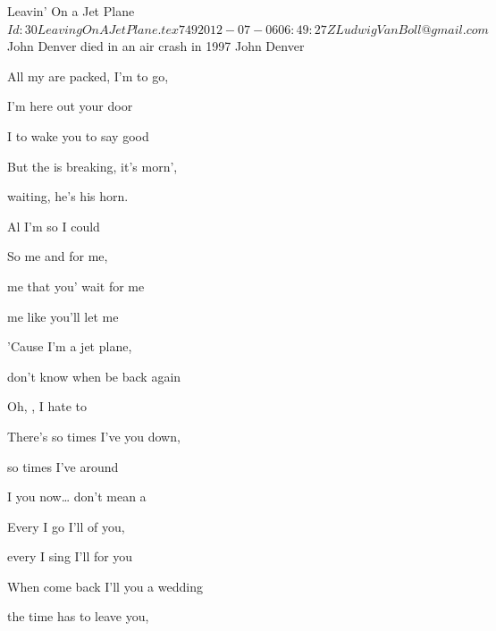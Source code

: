 \begin{SBSong}{Leavin' On a Jet Plane}
  {$Id: 30LeavingOnAJetPlane.tex 749 2012-07-06 06:49:27Z LudwigVanBoll@gmail.com $}
  {John Denver died in an air crash in 1997}
  {John Denver}
  \begin{SBVerse}
    All my  are packed, I'm  to go,

    I'm  here out your door
    
    I  to wake you  to say good  
    
    But the  is breaking, it's  morn', 
    
     waiting, he's  his horn.
    
    Al I'm so  I could   
  \end{SBVerse}
  \begin{SBChorus}
    So  me and  for me, 
    
     me that you' wait for me
    
     me like you'll  let me   
    
    'Cause I'm   a jet plane, 
    
    don't know when  be back again 
    
    Oh, , I hate to   
  \end{SBChorus}
  \begin{SBVerse}
    There's so  times I've  you down, 
    
    so  times I've  around
    
    I  you now\ldots {} don't mean a   
    
    Every  I go I'll  of you, 
    
    every  I sing I'll  for you
    
    When  come back I'll  you a wedding   
  \end{SBVerse}
  \begin{SBVerse}
     the time has  to leave you, 
    

\end{SBVerse}
\end{SBSong}
